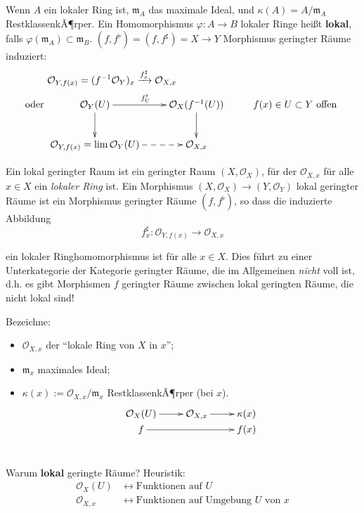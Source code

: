 \begin{notation*}
  Wenn $A$ ein lokaler Ring ist, $\mathfrak{m}_{A}$ das maximale Ideal,
  und $\kappa(A)=A/\mathfrak{m}_{A}$ RestklassenkÃ¶rper. Ein Homomorphismus
  $\varphi:A\rightarrow B$ lokaler Ringe heißt \textbf{lokal}, falls
  $\varphi(\mathfrak{m}_{A})\subset\mathfrak{m}_{B}$. $(f,f^{\flat})=(f,f^{\sharp})=X\rightarrow Y$
  Morphismus geringter Räume induziert:
  \begin{align*}
    & \mathcal{O}_{Y,f(x)}=(f^{-1}\mathcal{O}_{Y})_{x}\xrightarrow{f_{x}^{\sharp}}\mathcal{O}_{X,x}\\
    \text{oder } & \xymatrix{\mathcal{O}_{Y}(U)\ar[r]^{f_{U}^{\flat}}\ar[d] & \mathcal{O}_{X}(f^{-1}(U))\ar[d] & f(x)\in U\subset Y\text{ offen}\\
      \mathcal{O}_{Y,f(x)}=\lim\mathcal{O}_{Y}(U)\ar@{-->}[r] & \mathcal{O}_{X,x}
    }
  \end{align*}
\end{notation*}
\begin{defn}[orig. 31]
  Ein lokal geringter Raum ist ein geringter Raum $(X,\mathcal{O}_{X})$,
  für der $\mathcal{O}_{X,x}$ für alle $x\in X$ ein \emph{lokaler
    Ring} ist. Ein Morphismus $(X,\mathcal{O}_{X})\rightarrow(Y,\mathcal{O}_{Y})$
  lokal geringter Räume ist ein Morphismus geringter Räume $(f,f^{\flat})$,
  so dass die induzierte Abbildung 
  \[
  f_{x}^{\sharp}:\mathcal{O}_{Y,f(x)}\rightarrow\mathcal{O}_{X,x}
  \]

  ein lokaler Ringhomomorphismus ist für alle $x\in X$. Dies führt
  zu einer Unterkategorie der Kategorie geringter Räume, die im Allgemeinen
  \emph{nicht }voll ist, d.h. es gibt Morphismen $f$ geringter Räume
  zwischen lokal geringten Räume, die nicht lokal sind!
\end{defn}

Bezeichne: 
\begin{itemize}
\item $\mathcal{O}_{X,x}$ der ``lokale Ring von $X$ in $x$'';
\item $\mathfrak{m}_{x}$ maximales Ideal;
\item $\kappa(x):=\mathcal{O}_{X,x}/\mathfrak{m}_{x}$ RestklassenkÃ¶rper
  (bei $x$). \texttt{
  \[
  \xymatrix@R=0pt{\mathcal{O}_{X}(U)\ar[r] & \mathcal{O}_{X,x}\ar[r] & \kappa(x)\\
    f\ar[rr] &  & f(x)
  }
  \]
}
\end{itemize}
Warum \textbf{lokal} geringte Räume? Heuristik:
\begin{align*}
  \mathcal{O}_{X}(U) & \leftrightarrow\text{Funktionen auf }U\\
  \mathcal{O}_{X,x} & \leftrightarrow\text{Funktionen auf Umgebung }U\text{ von }x
\end{align*}

